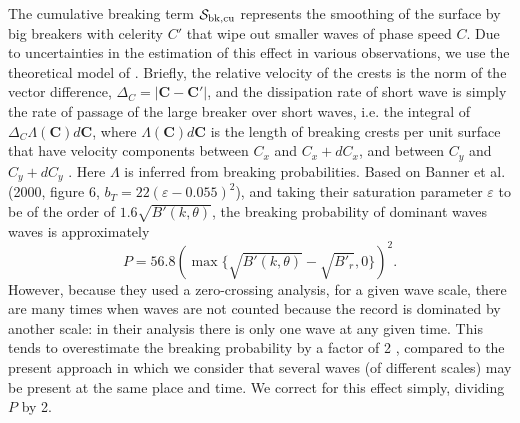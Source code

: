 The cumulative breaking term ${\cal S}_{\mathrm{bk,cu}}$ represents the smoothing of the
surface by big breakers with celerity $C'$ that wipe out smaller
waves of phase speed $C$. Due to
uncertainties in the estimation of this effect in various observations,
we use the theoretical model of \cite{art:Aea09}. Briefly,
the relative velocity of the crests is the norm of the vector
difference, $\Delta_C =\left|\mathbf{C}-\mathbf{C}'\right|$, and
the dissipation rate of short wave is simply the rate of passage
of the large breaker over short waves, i.e. the integral of
$\Delta_C \Lambda(\mathbf{C}) d\mathbf{C}$, where $\Lambda
(\mathbf{C}) d\mathbf{C}$ is the length of breaking crests per
unit surface that have velocity components between $C_x$ and
$C_x+dC_x$, and between $C_y$ and $C_y+dC_y$ \citep{art:Phi85}.
Here $\Lambda$ is inferred from breaking
probabilities. Based on  Banner et al. (2000, figure 6, $b_T=22 \left(\varepsilon-0.055\right)^2$)\nocite{art:BBY00}, and
taking their saturation parameter $\varepsilon$ to be of the order
of $1.6 \sqrt{B'(k,\theta)}$, the breaking probability of dominant waves
waves is approximately
\begin{equation}
P=56.8\left(\max\{\sqrt{B'(k,\theta)}-\sqrt{B'_r},0\}\right)^2.\label{PBanner}
\end{equation}
However, because they used a zero-crossing analysis, 
for a given wave scale, there are many times when waves are not counted because the record is dominated by another scale: in their analysis there is only one wave at any given time.
This tends to overestimate the breaking probability by a factor of 2 \citep{art:FAB10}, compared to the present approach in which we consider that several waves (of different scales) 
may be present at the same place and time. We correct for this effect simply, dividing 
$P$ by 2. 

